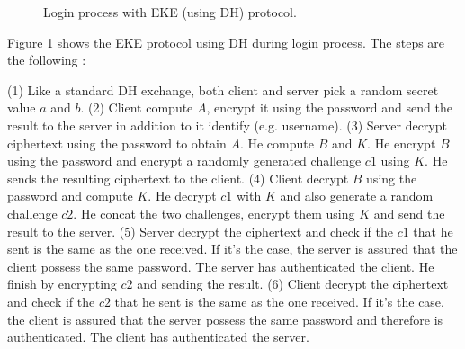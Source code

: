 \documentclass[../report.tex]{subfiles}
\begin{document}
\begin{figure}[h]
 \centering

 \setlength{\fboxsep}{10pt}
 \setlength{\fboxrule}{1pt}

 \caption{Login process with EKE (using DH) protocol.}
 \label{fig:EKE_DH}
\end{figure}

Figure \ref{fig:EKE_DH} shows the EKE protocol using DH during login process.
The steps are the following :

(1) Like a standard DH exchange, both client and server pick a random secret value $a$ and $b$.
(2) Client compute $A$, encrypt it using the password and send the result to the server in addition to it identify (e.g. username).
(3) Server decrypt ciphertext using the password to obtain $A$. He compute $B$ and $K$. He encrypt $B$ using the password and encrypt a randomly generated challenge $c1$ using $K$. He sends the resulting ciphertext to the client.
(4) Client decrypt $B$ using the password and compute $K$. He decrypt $c1$ with $K$ and also generate a random challenge $c2$. He concat the two challenges, encrypt them using $K$ and send the result to the server.
(5) Server decrypt the ciphertext and check if the $c1$ that he sent is the same as the one received. If it's the case, the server is assured that the client possess the same password. The server has authenticated the client. He finish by encrypting $c2$ and sending the result.
(6) Client decrypt the ciphertext and check if the $c2$ that he sent is the same as the one received. If it's the case, the client is assured that the server possess the same password and therefore is authenticated. The client has authenticated the server.
\end{document}
